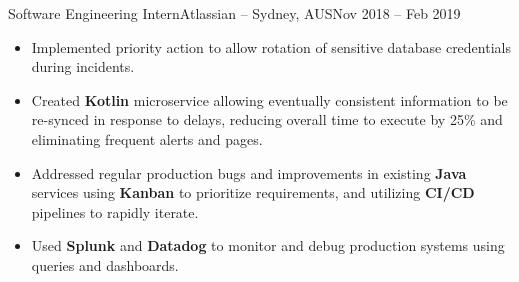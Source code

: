 \begin{cvsubsection}{Software Engineering Intern}{Atlassian -- Sydney, AUS}{Nov 2018 -- Feb 2019}
	\begin{itemize}
		\item Implemented priority action to allow rotation of sensitive database credentials during incidents.
		\item Created \textbf{Kotlin} microservice allowing eventually consistent information to be re-synced in response to delays, reducing overall time to execute by 25\% and eliminating frequent alerts and pages.
		\item Addressed regular production bugs and improvements in existing \textbf{Java} services using \textbf{Kanban} to prioritize requirements, and utilizing \textbf{CI/CD} pipelines to rapidly iterate.
		\item Used \textbf{Splunk} and \textbf{Datadog} to monitor and debug production systems using queries and dashboards.
	\end{itemize}
\end{cvsubsection}